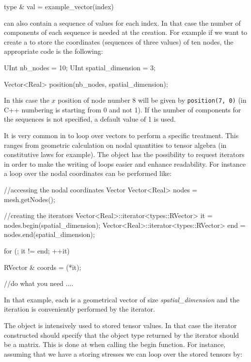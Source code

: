 \begin{cpp}
  type & val = example_vector(index)
\end{cpp}

 can also contain a
sequence of values for each index. In that case the number of components 
of each sequence is needed at the  creation. 
For example if we want to create a  to store
the coordinates (sequences of three values) of ten nodes, the appropriate 
code is the following:
\begin{cpp}
  UInt nb_nodes = 10;
  UInt spatial_dimension = 3;

  Vector<Real> position(nb_nodes, spatial_dimension);
\end{cpp}
In this case the $x$ position of node number 8 will be given by
\texttt{position(7, 0)} (in C++ numbering is starting from 0 and not
1). If the number of components for the sequences is not specified, a
default value of 1 is used. 

It is very common in \akantu to loop over vectors to perform a specific 
treatment. This ranges from geometric calculation on nodal quantities 
to tensor algebra (in constitutive laws for example).
The  object has the possibility to request iterators 
in order to make the writing of loops easier and enhance readability.
For instance a loop over the nodal coordinates can be performed like:
\begin{cpp}
  //accessing the nodal coordinates Vector
  Vector<Real> nodes = mesh.getNodes();
  
  //creating the iterators
  Vector<Real>::iterator<types::RVector> it  = nodes.begin(spatial_dimension);
  Vector<Real>::iterator<types::RVector> end = nodes.end(spatial_dimension);
  
  for (; it != end; ++it){
    RVector & coords = (*it);
    
    //do what you need
    ....
    
  }
\end{cpp}
In that example, each  is a geometrical vector of size \textit{spatial\_dimension}
and the iteration is conveniently performed by the  iterator.

The  object is intensively used to stored tensor values.
In that case the iterator constructed should specify that the object type
returned by the iterator should be a matrix. This is done at when calling the 
begin function. For instance, assuming that we have a  storing 
stresses we can loop over the stored tensors by:


